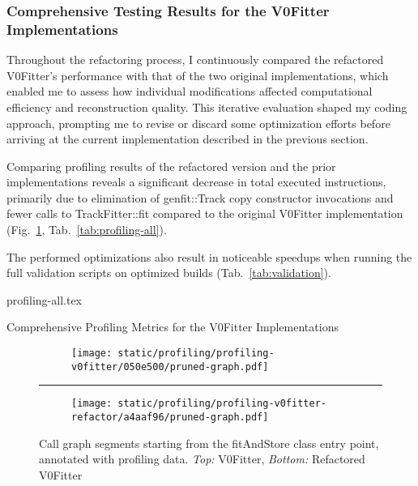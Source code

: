 \subsubsection{Comprehensive Testing Results for the V0Fitter Implementations}
Throughout the refactoring process, I continuously compared the refactored V0Fitter's performance with that of the two original implementations, which enabled me to assess how individual modifications affected computational efficiency and reconstruction quality.
This iterative evaluation shaped my coding approach, prompting me to revise or discard some optimization efforts before arriving at the current implementation described in the previous section.

Comparing profiling results of the refactored version and the prior implementations reveals a significant decrease in total executed instructions, primarily due to elimination of genfit::Track copy constructor invocations and fewer calls to TrackFitter::fit compared to the original V0Fitter implementation (Fig.\ \ref{fig:profiling-refactor}, Tab.\ \ref{tab:profiling-all}).

The performed optimizations also result in noticeable speedups when running the full validation scripts on optimized builds (Tab.\ \ref{tab:validation}).

\begin{table}[h]
  \begin{center}
    {profiling-all.tex}%
    \makebox[\linewidth]{\tab}
  \end{center}
  \caption{Comprehensive Profiling Metrics for the V0Fitter Implementations}
  \label{tab:profiling-all}
\end{table}

\begin{figure}[h]
  \vspace{-20pt}
  \centering
  \begin{subfigure}{\linewidth}
    \centering
    \texttt{[image: static/profiling/profiling-v0fitter/050e500/pruned-graph.pdf]}
  \end{subfigure}

  \vspace{-25pt}

  {\color{gray}\rule{\linewidth}{0.5pt}}

  \vspace{-15pt}

  \begin{subfigure}{\linewidth}
    \centering
    \texttt{[image: static/profiling/profiling-v0fitter-refactor/a4aaf96/pruned-graph.pdf]}
  \end{subfigure}

  \vspace{-20pt}

  \caption{
    Call graph segments starting from the fitAndStore class entry point, annotated with profiling data. \emph{Top:} V0Fitter, \emph{Bottom:} Refactored V0Fitter
  }
  \label{fig:profiling-refactor}
\end{figure}


